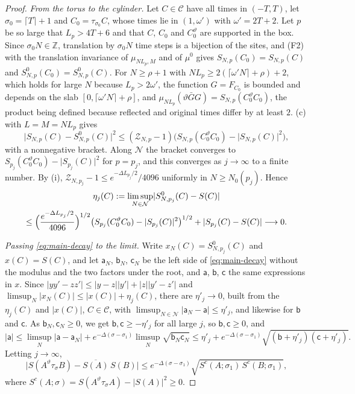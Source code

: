 \documentclass[11pt,a4paper]{amsart}
\theoremstyle{definition}
\theoremstyle{remark}
\numberwithin{equation}{section}
\newcommand{\Z}{\mathbb{Z}}          %
\newcommand{\abs}[1]{\lvert #1\rvert}      %
\newcommand{\TT}{\mathbb{T}}               %
\newcommand{\Zc}{\mathcal{Z}}              %
\newcommand{\Lp}{L_p}                      %
\begin{document}
\begin{proof}
\emph{From the torus to the cylinder.} Let $C\in\mathcal C$ have all times in $(-T,T)$, let $\sigma_0=\lceil T\rceil+1$ and $C_0=\tau_{\sigma_0}C$, whose times lie in $(1,\omega')$ with $\omega'=2T+2$. Let $p$ be so large that $\Lp>4T+6$ and that $C$, $C_0$ and $C_0^\vartheta$ are supported in the box. Since $\sigma_0N\in\Z$, translation by $\sigma_0N$ time steps is a bijection of the sites, and (F2) with the translation invariance of $\mu_{N\Lp,M}$ and of $\mu^0$ gives $S_{N,p}(C_0)=S_{N,p}(C)$ and $S^0_{N,p}(C_0)=S^0_{N,p}(C)$. For $N\ge\rho+1$ with $N\Lp\ge2(\lceil\omega'N\rceil+\rho)+2$, which holds for large $N$ because $\Lp>2\omega'$, the function $G=F_{C_0}$ is bounded and depends on the slab $[0,\lceil\omega'N\rceil+\rho]$, and $\mu_{N\Lp}(\vartheta\bar GG)=S_{N,p}(C_0^\vartheta C_0)$, the product being defined because reflected and original times differ by at least $2$. (c) with $L=M=N\Lp$ gives
\begin{equation}\label{eq:main-thermal}
\abs{S_{N,p}(C)-S^0_{N,p}(C)}^2\le(\Zc_{N,p}-1)\bigl(S_{N,p}(C_0^\vartheta C_0)-\abs{S_{N,p}(C)}^2\bigr),
\end{equation}
with a nonnegative bracket. Along $\mathcal N$ the bracket converges to $S_{p_j}(C_0^\vartheta C_0)-\abs{S_{p_j}(C)}^2$ for $p=p_j$, and this converges as $j\to\infty$ to a finite number. By (i), $\Zc_{N,p_j}-1\le e^{-\Delta L_{p_j}/2}/4096$ uniformly in $N\ge N_0(p_j)$. Hence
\begin{multline*}
\eta_j(C):=\limsup_{N\in\mathcal N}\abs{S^0_{N,p_j}(C)-S(C)}\\
\le\Bigl(\frac{e^{-\Delta L_{p_j}/2}}{4096}\Bigr)^{1/2}\bigl(S_{p_j}(C_0^\vartheta C_0)-\abs{S_{p_j}(C)}^2\bigr)^{1/2}+\abs{S_{p_j}(C)-S(C)}\longrightarrow0 .
\end{multline*}

\emph{Passing \eqref{eq:main-decay} to the limit.} Write $x_{N}(C)=S^0_{N,p_j}(C)$ and $x(C)=S(C)$, and let $\mathsf a_N$, $\mathsf b_N$, $\mathsf c_N$ be the left side of \eqref{eq:main-decay} without the modulus and the two factors under the root, and $\mathsf a$, $\mathsf b$, $\mathsf c$ the same expressions in $x$. Since $\abs{yy'-zz'}\le\abs{y-z}\abs{y'}+\abs{z}\abs{y'-z'}$ and $\limsup_N\abs{x_N(C)}\le\abs{x(C)}+\eta_j(C)$, there are $\eta'_j\to0$, built from the $\eta_j(C)$ and $\abs{x(C)}$, $C\in\mathcal C$, with $\limsup_{N\in\mathcal N}\abs{\mathsf a_N-\mathsf a}\le\eta'_j$, and likewise for $\mathsf b$ and $\mathsf c$. As $\mathsf b_N,\mathsf c_N\ge0$, we get $\mathsf b,\mathsf c\ge-\eta'_j$ for all large $j$, so $\mathsf b,\mathsf c\ge0$, and
\[
\abs{\mathsf a}\le\limsup_N\abs{\mathsf a-\mathsf a_N}+e^{-\Delta(\sigma-\sigma_1)}\limsup_N\sqrt{\mathsf b_N\mathsf c_N}\le\eta'_j+e^{-\Delta(\sigma-\sigma_1)}\sqrt{(\mathsf b+\eta'_j)(\mathsf c+\eta'_j)} .
\]
Letting $j\to\infty$,
\begin{equation}\label{eq:main-limit}
\bigl\lvert S(A^\vartheta\tau_\sigma B)-\overline{S(A)}\,S(B)\bigr\rvert\le e^{-\Delta(\sigma-\sigma_1)}\sqrt{S^c(A;\sigma_1)\,S^c(B;\sigma_1)},
\end{equation}
where $S^c(A;\sigma)=S(A^\vartheta\tau_\sigma A)-\abs{S(A)}^2\ge0$.


\end{proof}
\end{document}
